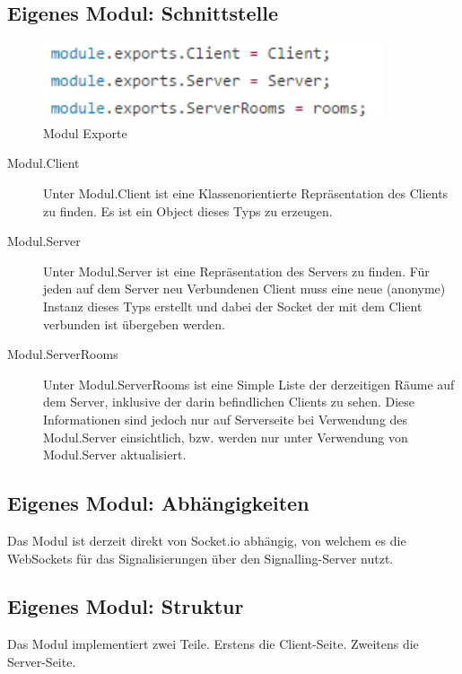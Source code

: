 \subsection{Eigenes Modul: Schnittstelle}
\begin{figure}[htH]
\centering
\includegraphics[width=0.9\textwidth]{backend/ModulExports.PNG}
\caption{Modul Exporte}
\label{backfig2}
\end{figure}

\begin{description}
\item[Modul.Client]
Unter Modul.Client ist eine Klassenorientierte Repräsentation des Clients zu 
finden. Es ist ein Object dieses Typs zu erzeugen.

\item[Modul.Server]
Unter Modul.Server ist eine Repräsentation des Servers zu finden. Für jeden auf 
dem Server neu Verbundenen Client muss eine neue (anonyme) Instanz dieses Typs 
erstellt und dabei der Socket der mit dem Client verbunden ist übergeben werden.

\item[Modul.ServerRooms]
Unter Modul.ServerRooms ist eine Simple Liste der derzeitigen Räume auf dem 
Server, inklusive der darin befindlichen Clients zu sehen. Diese Informationen 
sind jedoch nur auf Serverseite bei Verwendung des Modul.Server einsichtlich, 
bzw. werden nur unter Verwendung von Modul.Server aktualisiert.
\end{description}



\subsection{Eigenes Modul: Abhängigkeiten}
Das Modul ist derzeit direkt von Socket.io abhängig, von welchem es die 
WebSockets für das Signalisierungen über den Signalling-Server nutzt.



\subsection{Eigenes Modul: Struktur}
Das Modul implementiert zwei Teile. Erstens die Client-Seite. Zweitens die 
Server-Seite.




